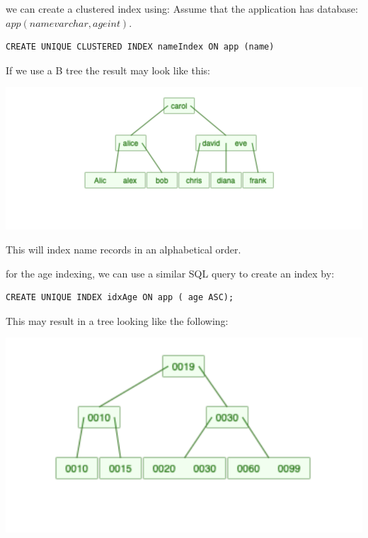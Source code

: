 \documentclass[a4paper, 11pt]{article}
\begin{document}
\begin{enumerate}
we can create a clustered index using: 
Assume that the application has database: $app(name varchar, age int)$.
\begin{verbatim}
CREATE UNIQUE CLUSTERED INDEX nameIndex ON app (name)
\end{verbatim}
If we use a B tree the result may look like this:

\includegraphics[width=\textwidth]{namesclustered.png}

This will index name records in an alphabetical order. 

for the age indexing, we can use a similar SQL query to create an index by:
\begin{verbatim}
CREATE UNIQUE INDEX idxAge ON app ( age ASC);
\end{verbatim}
This may result in a tree looking like the following:

\includegraphics[width=\textwidth]{agetree.png}

\end{enumerate}
\end{document}
